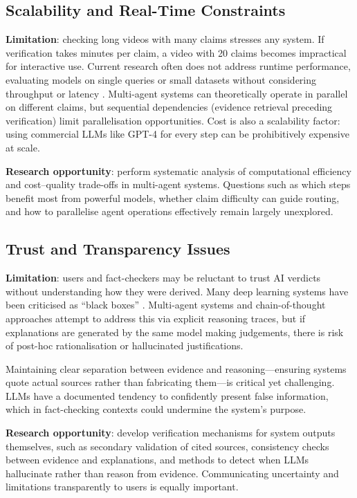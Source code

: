 \documentclass[12pt,a4paper]{article}
\begin{document}
\subsection{Scalability and Real-Time Constraints}

\textbf{Limitation}: checking long videos with many claims stresses any system. If verification takes minutes per claim, a video with 20 claims becomes impractical for interactive use. Current research often does not address runtime performance, evaluating models on single queries or small datasets without considering throughput or latency \citep{lin2025factaudit}. Multi-agent systems can theoretically operate in parallel on different claims, but sequential dependencies (evidence retrieval preceding verification) limit parallelisation opportunities. Cost is also a scalability factor: using commercial LLMs like GPT-4 for every step can be prohibitively expensive at scale.

\textbf{Research opportunity}: perform systematic analysis of computational efficiency and cost–quality trade-offs in multi-agent systems. Questions such as which steps benefit most from powerful models, whether claim difficulty can guide routing, and how to parallelise agent operations effectively remain largely unexplored.

\subsection{Trust and Transparency Issues}

\textbf{Limitation}: users and fact-checkers may be reluctant to trust AI verdicts without understanding how they were derived. Many deep learning systems have been criticised as ``black boxes'' \citep{wardle2017information}. Multi-agent systems and chain-of-thought approaches attempt to address this via explicit reasoning traces, but if explanations are generated by the same model making judgements, there is risk of post-hoc rationalisation or hallucinated justifications.

Maintaining clear separation between evidence and reasoning—ensuring systems quote actual sources rather than fabricating them—is critical yet challenging. LLMs have a documented tendency to confidently present false information, which in fact-checking contexts could undermine the system's purpose.

\textbf{Research opportunity}: develop verification mechanisms for system outputs themselves, such as secondary validation of cited sources, consistency checks between evidence and explanations, and methods to detect when LLMs hallucinate rather than reason from evidence. Communicating uncertainty and limitations transparently to users is equally important.
\end{document}
